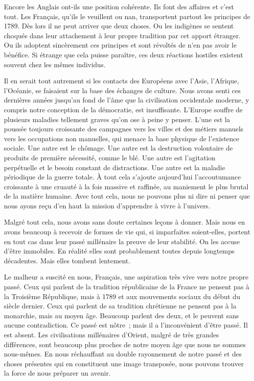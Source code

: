\documentclass[french,twoside]{book} %
\begin{document}
Encore les Anglais ont-ils une position cohérente. Ils font des affaires et c'est tout. Les Français, qu'ils le veuillent ou nan, transportent partout les principes de 1789. Dès lors il ne peut arriver que deux choses. Ou les indigè­nes se sentent choqués dans leur attachement à leur propre tradition par cet apport étranger. Ou ils adoptent sincèrement ces principes et sont révoltés de n'en pas avoir le bénéfice. Si étrange que cela puisse paraître, ces deux réactions hostiles existent souvent chez les mêmes individus.\par
Il en serait tout autrement si les contacts des Européens avec l'Asie, l'Afrique, l'Océanie, se faisaient sur la base des échanges de culture. Nous avons senti ces dernières années jusqu'au fond de l'âme que la civilisation occidentale moderne, y compris notre conception de la démocratie, est insuf­fisante. L'Europe souffre de plusieurs maladies tellement graves qu'on ose à peine y penser. L'une est la poussée toujours croissante des campagnes vers les villes et des métiers manuels vers les occupations non manuelles, qui menace la base physique de l'existence sociale. Une autre est le chômage. Une autre est la destruction volontaire de produits de première nécessité, comme le blé. Une autre est l'agitation perpétuelle et le besoin constant de distractions. Une autre est la maladie périodique de la guerre totale. À tout cela s'ajoute aujourd'hui l'accoutumance croissante à une cruauté à la fois massive et raffinée, au maniement le plus brutal de la matière humaine. Avec tout cela, nous ne pouvons plus ni dire ni penser que nous ayons reçu d'en haut la mission d'apprendre à vivre à l'univers.\par
Malgré tout cela, nous avons sans doute certaines leçons à donner. Mais nous en avons beaucoup à recevoir de formes de vie qui, si imparfaites soient-elles, portent en tout cas dans leur passé millénaire la preuve de leur stabilité. On les accuse d'être immobiles. En réalité elles sont probablement toutes depuis longtemps décadentes. Mais elles tombent lentement.\par
Le malheur a suscité en nous, Français, une aspiration très vive vers notre propre passé. Ceux qui parlent de la tradition républicaine de la France ne pensent pas à la Troisième République, mais à 1789 et aux mouvements sociaux du début du siècle dernier. Ceux qui parlent de sa tradition chrétienne ne pensent pas à la monarchie, mais au moyen âge. Beaucoup parlent des deux, et le peuvent sans aucune contradiction. Ce passé est nôtre ; mais il a l'inconvénient d'être passé. Il est absent. Les civilisations millénaires d'Orient, malgré de très grandes différences, sont beaucoup plus proches de notre moyen âge que nous ne sommes nous-mêmes. En nous réchauffant au double rayonnement de notre passé et des choses présentes qui en constituent une image transposée, nous pouvons trouver la force de nous préparer un avenir.\par
\end{document}
